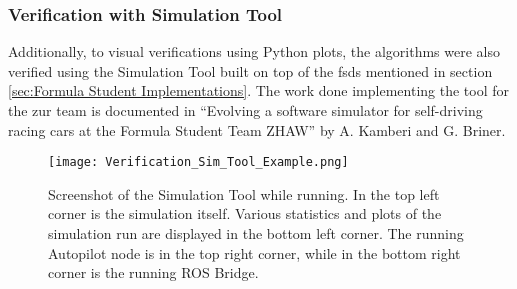 \subsubsection{Verification with Simulation Tool} \label{sec:Verification with Simulation Tool}
Additionally, to visual verifications using Python plots, the algorithms were also verified using the Simulation Tool built on top of the \acrlong{fsds} mentioned in section \ref{sec:Formula Student Implementations}. The work done implementing the tool for the \acrlong{zur} team is documented in ``Evolving a software simulator for self-driving racing cars at the Formula Student Team ZHAW'' by A. Kamberi and G. Briner. \cite{zur_sim_tool}
\begin{figure}[H]
    \centering
    \texttt{[image: Verification\_Sim\_Tool\_Example.png]}
    \caption{Screenshot of the Simulation Tool while running. In the top left corner is the simulation itself. Various statistics and plots of the simulation run are displayed in the bottom left corner. The running Autopilot node is in the top right corner, while in the bottom right corner is the running ROS Bridge.}
    \label{fig:Verification Sim Tool Example}
\end{figure}

